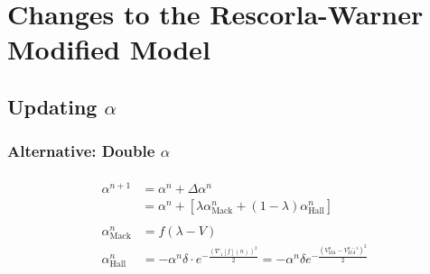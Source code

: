 \documentclass[11pt,a4paper]{article}
\newcommand{\alphamack}{\alpha _{\text{Mack}}}
\newcommand{\alphahall}{\alpha _{\text{Hall}}}
\begin{document}
\section*{Changes to the Rescorla-Warner Modified Model}

\subsection{Updating $\alpha$}

\subsubsection{\textbf{Alternative}: Double $\alpha$}
\begin{gather*}
	\begin{aligned}
	\alpha ^{n + 1}
		&= \alpha ^n + \Delta \alpha ^n \\
		&= \alpha ^n + \left[ \lambda \alphamack ^n + (1 - \lambda) \alphahall ^n \right]
	\end{aligned} \\[1em]
	\begin{aligned}
		\alphamack ^n &= f ( \lambda - V ) \\
		\alphahall ^n &= - \alpha ^n \delta \cdot e^{- \frac{(\nabla_1 [ f ] ( n ) ) ^2 }{2}} = - \alpha ^n \delta e ^ {- \frac{(V^n_{\text{MA}} - V^{n - 1}_{MA}) ^2}{2}}
	\end{aligned}
\end{gather*}
\end{document}
